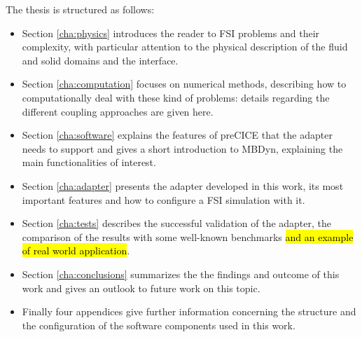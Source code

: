 The thesis is structured as follows:
\begin{itemize}
	\item Section \ref{cha:physics} introduces the reader to FSI problems and their complexity, with particular attention to the physical description of the fluid and solid domains and the interface. 
	\item Section \ref{cha:computation} focuses on numerical methods, describing how to computationally deal with these kind of problems: details regarding the different coupling approaches are given here.
	\item Section \ref{cha:software} explains the features of preCICE that the adapter needs to support and gives a short introduction to MBDyn, explaining the main functionalities of interest.
	\item Section \ref{cha:adapter} presents the adapter developed in this work, its most important features and how to configure a FSI simulation with it.
	\item Section \ref{cha:tests} describes the successful validation of the adapter, the comparison of the results with some well-known benchmarks \hl{and an example of real world application}.
	\item Section \ref{cha:conclusions} summarizes the the findings and outcome of this work and gives an outlook to future work on this topic.
	\item Finally four appendices give further information concerning the structure and the configuration of the software components used in this work.   
\end{itemize} 

